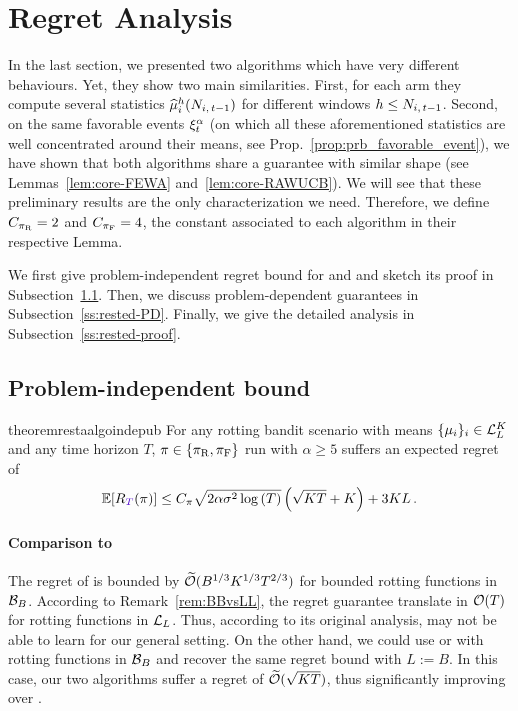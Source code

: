 \section{Regret Analysis}\label{sec:theory}

In the last section, we presented two algorithms which have very different behaviours. Yet, they show two main similarities. First, for each arm they compute several statistics $\widehat{\mu}_i^h(N_{i,\,t-1})$ for different windows $h\leq N_{i,\,t-1}$. Second, on the same favorable events $\xi^\alpha_t$ (on which all these aforementioned statistics are well concentrated around their means, see Prop.~\ref{prop:prb_favorable_event}), we have shown that both algorithms share a guarantee with similar shape (see Lemmas~\ref{lem:core-FEWA} and~\ref{lem:core-RAWUCB}). We will see that these preliminary results are the only characterization we need. Therefore, we define $C_{\pi_{\rm R}} = 2$ and $C_{\pi_{\rm F}} = 4$, the constant associated to each algorithm in their respective Lemma. 

We first give problem-independent regret bound for \FEWA and \RUCB and sketch its proof in Subsection~\ref{ss:rested-PI}. Then, we discuss problem-dependent guarantees in Subsection~\ref{ss:rested-PD}. Finally, we give the detailed analysis in Subsection~\ref{ss:rested-proof}.


\subsection{Problem-independent bound}
\label{ss:rested-PI}
\begin{restatable}{theorem}{restaalgoindepub}
\label{th:rested-PI}
For any rotting bandit scenario with means $\{\mu_i\}_{i} \in \mathcal{L}_L^K$ and any time horizon $T$, $\pi \in \left\{\pi_{\rm R}, \pi_{\rm F} \right\}$ run with $\alpha \geq 5$ suffers an expected regret of
\begin{equation*}
\mathbb{E}[\regret(\pi)] \leq C_\pi\sqrt{2\alpha\sigma^2\log\pa{T}}\pa{\sqrt{KT} +K} + 3KL\,.
\end{equation*}
\end{restatable}
\paragraph{Comparison to \citet{levine2017rotting}} The regret of \SWA is bounded by $\widetilde{\mathcal{O}}(B^{1/3}K^{1/3} T^{2/3})$ for bounded rotting functions in $\mathcal{B}_{B}$. According to Remark~\ref{rem:BBvsLL}, the regret guarantee translate in $\mathcal{O}(T)$ for rotting functions in $\mathcal{L}_L$.  Thus, according to its original analysis, \SWA may not be able to learn for our general setting. On the other hand, we could use \FEWA or \RUCB with rotting functions in $\mathcal{B}_{B}$ and recover the same regret bound with $L := B$. In this case, our two algorithms suffer a regret of $\widetilde{\mathcal{O}}(\sqrt{KT})$, thus significantly improving over \SWA. 

